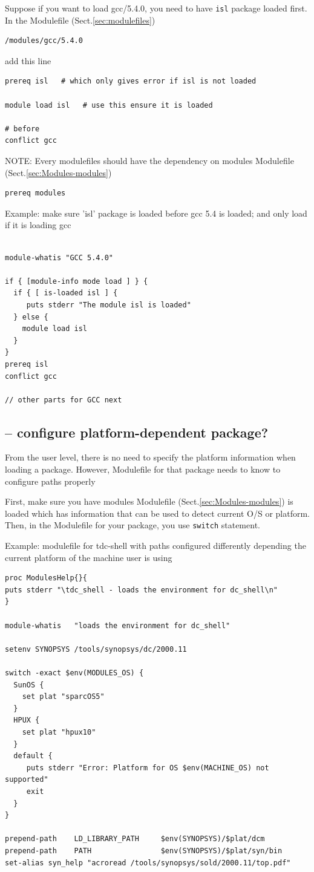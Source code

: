 Suppose if you want to load gcc/5.4.0, you need to have \verb!isl! package
loaded first. In the Modulefile (Sect.\ref{sec:modulefiles}) 
\begin{verbatim}
/modules/gcc/5.4.0
\end{verbatim}
add this line
\begin{verbatim}
prereq isl   # which only gives error if isl is not loaded

module load isl   # use this ensure it is loaded

# before
conflict gcc
\end{verbatim}

NOTE: Every modulefiles should have the dependency on modules Modulefile
(Sect.\ref{sec:Modules-modules})
\begin{verbatim}
prereq modules
\end{verbatim}

Example: make sure 'isl' package is loaded before gcc 5.4 is loaded; and only
load if it is loading gcc
\begin{verbatim}

module-whatis "GCC 5.4.0"

if { [module-info mode load ] } {
  if { [ is-loaded isl ] {
     puts stderr "The module isl is loaded"
  } else {
    module load isl
  }
}
prereq isl
conflict gcc 

// other parts for GCC next
\end{verbatim}

\subsection{-- configure platform-dependent package?}
\label{sec:Modules-load-package-platform-dependent}

From the user level, there is no need to specify the platform information when
loading a package. However, Modulefile for that package needs to know
to configure paths properly  

First, make sure you have modules Modulefile (Sect.\ref{sec:Modules-modules}) is
loaded which has information that can be used to detect current O/S or platform.
Then, in the Modulefile for your package, you use \verb!switch! statement.

Example: modulefile for tdc-shell with paths configured differently depending
the current platform of the machine user is using

\begin{verbatim}
proc ModulesHelp{}{
puts stderr "\tdc_shell - loads the environment for dc_shell\n"
}

module-whatis   "loads the environment for dc_shell"

setenv SYNOPSYS /tools/synopsys/dc/2000.11

switch -exact $env(MODULES_OS) {
  SunOS {
    set plat "sparcOS5"
  }
  HPUX {
    set plat "hpux10"
  }
  default {
     puts stderr "Error: Platform for OS $env(MACHINE_OS) not supported"
     exit
  }
}

prepend-path    LD_LIBRARY_PATH     $env(SYNOPSYS)/$plat/dcm
prepend-path    PATH                $env(SYNOPSYS)/$plat/syn/bin
set-alias syn_help "acroread /tools/synopsys/sold/2000.11/top.pdf"
\end{verbatim}

